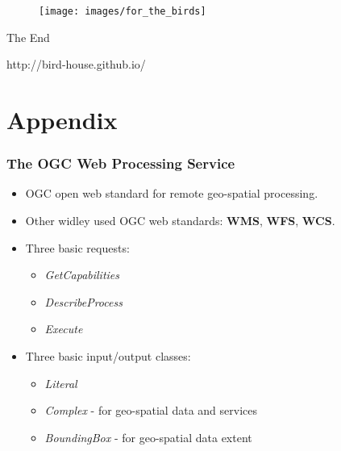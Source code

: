 \documentclass{beamer}
\begin{document}
\begin{frame}

  \begin{figure}[ht]
   \centering
   \texttt{[image: images/for\_the\_birds]}
  \end{figure}

\centering
\Huge{The End}

\vspace{0.4cm}
\normalsize{http://bird-house.github.io/}
\end{frame}

\appendix

\section{Appendix}

\begin{frame}
\frametitle<presentation>{The OGC Web Processing Service}

\begin{itemize}
\item OGC open web standard for remote geo-spatial processing.
\item Other widley used OGC web standards: \textbf{WMS}, \textbf{WFS}, \textbf{WCS}.
\item Three basic requests:
\begin{itemize}
      \item  \textit{GetCapabilities}
      \item  \textit{DescribeProcess}
      \item  \textit{Execute}
\end{itemize}
\item Three basic input/output classes:
\begin{itemize}
      \item  \textit{Literal}
      \item  \textit{Complex} - for geo-spatial data and services
      \item  \textit{BoundingBox} - for geo-spatial data extent
\end{itemize}
\end{itemize}
\end{frame}
\end{document}
